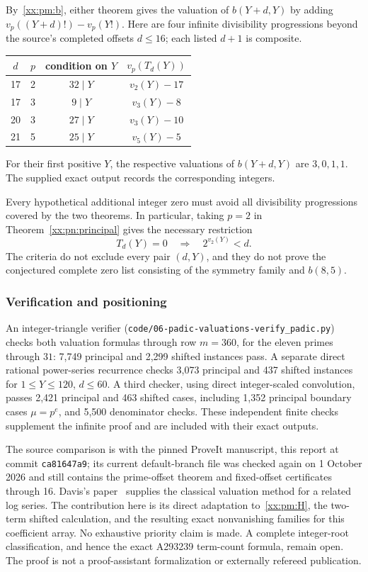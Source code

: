 \documentclass[11pt,a4paper]{article}
\numberwithin{equation}{section}
\theoremstyle{definition}
\theoremstyle{remark}
\theoremstyle{plain}
\begin{document}
By~\eqref{xx:pm:b}, either theorem gives the valuation of $b(Y+d,Y)$ by adding
$v_p((Y+d)!)-v_p(Y!)$. Here are four infinite divisibility progressions beyond
the source's completed offsets $d\le16$; each listed $d+1$ is composite.
\begin{center}
\begin{tabular}{c|c|c|c}
$d$&$p$&condition on $Y$&$v_p(T_d(Y))$\\\hline
17&2&$32\mid Y$&$v_2(Y)-17$\\
17&3&$9\mid Y$&$v_3(Y)-8$\\
20&3&$27\mid Y$&$v_3(Y)-10$\\
21&5&$25\mid Y$&$v_5(Y)-5$
\end{tabular}
\end{center}
For their first positive $Y$, the respective valuations of $b(Y+d,Y)$ are
$3,0,1,1$. The supplied exact output records the corresponding integers.

Every hypothetical additional integer zero must avoid all divisibility
progressions covered by the two theorems. In particular, taking $p=2$ in
Theorem~\ref{xx:pn:principal} gives the necessary restriction
\[
 T_d(Y)=0\quad\Longrightarrow\quad 2^{v_2(Y)}<d.
\]
The criteria do not exclude every pair $(d,Y)$, and they do not prove the
conjectured complete zero list consisting of the symmetry family and $b(8,5)$.

\subsubsection{Verification and positioning}

An integer-triangle verifier
(\texttt{code/06-padic-\allowbreak valuations-\allowbreak verify\_padic.py})
checks both valuation formulas through row $m=360$, for the eleven primes
through $31$: 7,749 principal and 2,299 shifted instances pass. A separate
direct rational power-series recurrence checks 3,073 principal and 437 shifted
instances for $1\le Y\le120$, $d\le60$. A third checker, using direct
integer-scaled convolution, passes 2,421 principal and 463 shifted cases,
including 1,352 principal boundary cases $\mu=p^e$, and 5,500 denominator
checks. These independent finite checks supplement the infinite proof and are
included with their exact outputs.

The source comparison is with the pinned ProveIt manuscript, this report at
commit \texttt{ca81647a9}; its current default-branch file was checked again on
1 October 2026 and still contains the prime-offset theorem and fixed-offset
certificates through 16. Davis's paper~\cite{xx-davis} supplies the classical
valuation method for a related log series. The contribution here is its direct
adaptation to~\eqref{xx:pm:H}, the two-term shifted calculation, and the
resulting exact nonvanishing families for this coefficient array. No
exhaustive priority claim is made. A complete integer-root classification, and
hence the exact A293239 term-count formula, remain open. The proof is not a
proof-assistant formalization or externally refereed publication.
\end{document}
